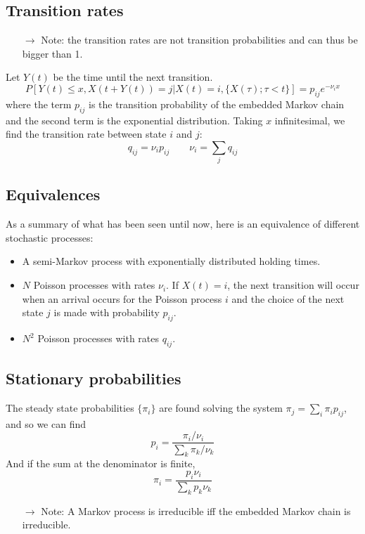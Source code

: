 \documentclass[12pt, openany]{report}
\theoremstyle{definition}
\begin{document}
\subsection{Transition rates}
\begin{itemize}
	\item [$\to$] Note: the transition rates are not transition probabilities and can thus be bigger than 1.
\end{itemize}
Let $Y(t)$ be the time until the next transition. 
\begin{equation}
	P[Y(t)\le x ,X(t+Y(t))=j|X(t)=i,\{X(\tau);\tau<t\}] = p_{ij}e^{-\nu_ix} 
\end{equation}
where the term $p_{ij}$ is the transition probability of the embedded Markov chain and the second term is the exponential distribution. Taking $x$ infinitesimal, we find  the transition rate between state $i$ and $j$:
\begin{equation}
	q_{ij} = \nu_i p_{ij}\qquad \nu_i = \sum_j q_{ij}
\end{equation}
\subsection{Equivalences}
As a summary of what has been seen until now, here is an equivalence of different stochastic processes:
\begin{itemize}
	\item A semi-Markov process with exponentially distributed holding times.
	\item $N$ Poisson processes with rates $\nu_i$. If $X(t)=i$, the next transition will occur when an arrival occurs for the Poisson process $i$ and the choice of the next state $j$ is made with probability $p_{ij}$.
	\item $N^2$ Poisson processes with rates $q_{ij}$. 
\end{itemize}
\subsection{Stationary probabilities}
The steady state probabilities $\{\pi_i\}$ are found solving the system $\pi_j = \sum_i \pi_i p_{ij}$, and so we can find 
\begin{equation}
	p_i = \frac{\pi_i/\nu_i}{\sum_k \pi_k/\nu_k}
\end{equation}
And if the sum at the denominator is finite, 
\begin{equation}
	\pi_i = \frac{p_i\nu_i}{\sum_k p_k\nu_k}
\end{equation}
\begin{itemize}
	\item [$\to$] Note: A Markov process is irreducible iff the embedded Markov chain is irreducible.
\end{itemize}
\end{document}
